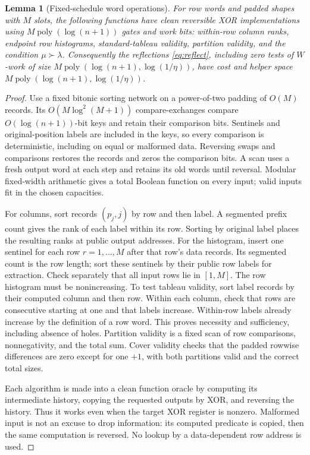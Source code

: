 \documentclass[11pt]{article}
\newtheorem{lemma}[theorem]{Lemma}
\theoremstyle{definition}
\newcommand{\poly}{\operatorname{poly}}
\begin{document}
\begin{lemma}[Fixed-schedule word operations]\label{lem:words}
For row words and padded shapes with $M$ slots, the following functions have
clean reversible XOR implementations using $M\poly(\log(n+1))$ gates and
work bits: within-row column ranks, endpoint row histograms, standard-tableau
validity, partition validity, and the condition $\mu\succ\lambda$.
Consequently the reflections \eqref{eq:reflect}, including zero tests of
$W$-work of size $M\poly(\log(n+1),\log(1/\eta))$, have cost and helper
space $M\poly(\log(n+1),\log(1/\eta))$.
\end{lemma}

\begin{proof}
Use a fixed bitonic sorting network on a power-of-two padding of $O(M)$
records. Its $O(M\log^2(M+1))$ compare-exchanges compare $O(\log(n+1))$-bit
keys and retain their comparison bits. Sentinels and original-position
labels are included in the keys, so every comparison is deterministic,
including on equal or malformed data. Reversing swaps and comparisons
restores the records and zeros the comparison bits. A scan uses a fresh
output word at each step and retains its old words until reversal. Modular
fixed-width arithmetic gives a total Boolean function on every input;
valid inputs fit in the chosen capacities.

For columns, sort records $(p_j,j)$ by row and then label. A segmented
prefix count gives the rank of each label within its row. Sorting by
original label places the resulting ranks at public output addresses.
For the histogram, insert one sentinel for each row $r=1,\ldots,M$ after
that row's data records. Its segmented count is the row length; sort these
sentinels by their public row labels for extraction. Check separately that
all input rows lie in $[1,M]$. The row histogram must be nonincreasing.
To test tableau validity, sort label records by their computed column and
then row. Within each column, check that rows are consecutive starting at
one and that labels increase. Within-row labels already increase by the
definition of a row word. This proves necessity and sufficiency, including
absence of holes. Partition validity is a fixed scan of row comparisons,
nonnegativity, and the total sum. Cover validity checks that the padded
rowwise differences are zero except for one $+1$, with both partitions
valid and the correct total sizes.

Each algorithm is made into a clean function oracle by computing its
intermediate history, copying the requested outputs by XOR, and reversing
the history. Thus it works even when the target XOR register is nonzero.
Malformed input is not an excuse to drop information: its computed
predicate is copied, then the same computation is reversed. No lookup by a
data-dependent row address is used.


\end{proof}
\end{document}
